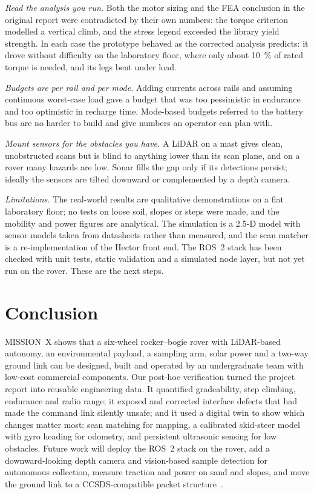 \documentclass[conference]{IEEEtran}
\begin{document}
\emph{Read the analysis you run.} Both the motor sizing and the FEA conclusion in the original report were contradicted by their own numbers: the torque criterion modelled a vertical climb, and the stress legend exceeded the library yield strength. In each case the prototype behaved as the corrected analysis predicts: it drove without difficulty on the laboratory floor, where only about \SI{10}{\percent} of rated torque is needed, and its legs bent under load.

\emph{Budgets are per rail and per mode.} Adding currents across rails and assuming continuous worst-case load gave a budget that was too pessimistic in endurance and too optimistic in recharge time. Mode-based budgets referred to the battery bus are no harder to build and give numbers an operator can plan with.

\emph{Mount sensors for the obstacles you have.} A LiDAR on a mast gives clean, unobstructed scans but is blind to anything lower than its scan plane, and on a rover many hazards are low. Sonar fills the gap only if its detections persist; ideally the sensors are tilted downward or complemented by a depth camera.

\emph{Limitations.} The real-world results are qualitative demonstrations on a flat laboratory floor; no tests on loose soil, slopes or steps were made, and the mobility and power figures are analytical. The simulation is a 2.5-D model with sensor models taken from datasheets rather than measured, and the scan matcher is a re-implementation of the Hector front end. The ROS~2 stack has been checked with unit tests, static validation and a simulated node layer, but not yet run on the rover. These are the next steps.

\section{Conclusion}
MISSION~X shows that a six-wheel rocker--bogie rover with LiDAR-based autonomy, an environmental payload, a sampling arm, solar power and a two-way ground link can be designed, built and operated by an undergraduate team with low-cost commercial components. Our post-hoc verification turned the project report into reusable engineering data. It quantified gradeability, step climbing, endurance and radio range; it exposed and corrected interface defects that had made the command link silently unsafe; and it used a digital twin to show which changes matter most: scan matching for mapping, a calibrated skid-steer model with gyro heading for odometry, and persistent ultrasonic sensing for low obstacles. Future work will deploy the ROS~2 stack on the rover, add a downward-looking depth camera and vision-based sample detection for autonomous collection, measure traction and power on sand and slopes, and move the ground link to a CCSDS-compatible packet structure~\cite{ccsds133}.
\end{document}
